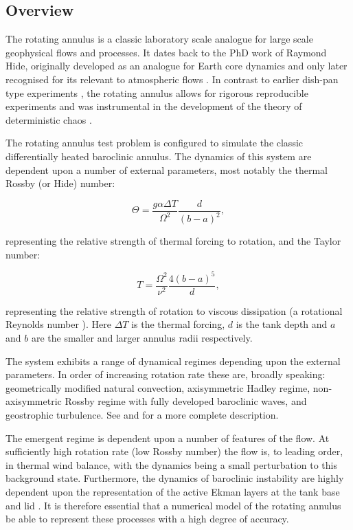 \subsection{Overview}

The rotating annulus is a classic laboratory scale analogue for large scale
geophysical flows and processes. It dates back to the PhD work of Raymond Hide,
originally developed as an analogue for Earth core dynamics \citep{hide1952} and only
later recognised for its relevant to atmospheric flows \citep{hide1953, hide2006}.
In contrast to earlier dish-pan type experiments \citep{fultz1951}, the rotating
annulus allows for rigorous reproducible experiments and was instrumental in the
development of the theory of deterministic chaos \citep{lorenz1963}.

The rotating annulus test problem is configured to simulate the classic
differentially heated baroclinic annulus. The dynamics
of this system are dependent upon a number of external parameters, most notably
the thermal Rossby (or Hide) number:

\begin{equation}\label{eqn:hide_number}
  \Theta = \frac{g \alpha \Delta T}{\Omega^2} \frac{d}{(b - a)^2},
\end{equation}

representing the relative strength of thermal forcing to rotation, and the Taylor number:

\begin{equation}\label{eqn:taylor_number}
  T = \frac{\Omega^2}{\nu^2} \frac{4(b - a)^5}{d},
\end{equation}

representing the relative strength of rotation to viscous dissipation (a rotational
Reynolds number \citep{lorenz1967}). Here $\Delta T$ is the thermal forcing, $d$ is the tank depth and $a$ and $b$
are the smaller and larger annulus radii respectively.

The system exhibits a range of dynamical regimes depending upon the external parameters.
In order of increasing rotation
rate these are, broadly speaking: geometrically modified natural convection,
axisymmetric Hadley regime, non-axisymmetric Rossby regime with fully developed
baroclinic waves, and geostrophic turbulence. See \citet{hide1975} and \citet{frueh1997}
for a more complete description.

The emergent regime is dependent upon a number of features of the flow. At
sufficiently high rotation rate (low Rossby number) the flow is, to leading
order, in thermal wind balance, with the dynamics being a small perturbation to
this background state. Furthermore, the dynamics of baroclinic instability are
highly dependent upon the representation of the active Ekman layers at the tank
base and lid \citep{hide1969}. It is therefore essential that a numerical model
of the rotating annulus be able to represent these processes with a high degree
of accuracy.

